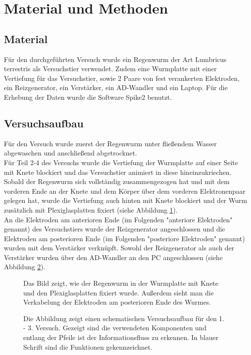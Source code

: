 \documentclass[11pt]{article}
\begin{document}
\section{Material und Methoden}
\subsection{Material}
Für den durchgeführten Versuch wurde ein Regenwurm der Art Lumbricus terrestris als Versuchstier verwendet. Zudem eine Wurmplatte mit einer Vertiefung für das Versuchstier, sowie 2 Paare von fest verankerten Elektroden, ein Reizgenerator, ein Verstärker, ein AD-Wandler und ein Laptop. Für die Erhebung der Daten wurde die Software Spike2 benutzt.
\subsection{Versuchsaufbau}
Für den Versuch wurde zuerst der Regenwurm unter fließendem Wasser abgewaschen und anschließend abgetrocknet.\\
Für Teil 2-4 des Versuchs wurde die Vertiefung der Wurmplatte auf einer Seite mit Knete blockiert und das Versuchstier animiert in diese hineinzukriechen. Sobald der Regenwurm sich vollständig zusammengezogen hat und mit dem vorderen Ende an der Knete und dem Körper über dem vorderen Elektronenpaar gelegen hat, wurde die Vertiefung auch hinten mit Knete blockiert und der Wurm zusätzlich mit Plexiglasplatten fixiert (siehe Abbildung \ref{foto}). \\
An die Elektroden am anterioren Ende (im Folgenden "{}anteriore Elektroden"{} genannt) des Versuchstiers wurde der Reizgenerator angeschlossen und die Elektroden am posterioren Ende (im Folgenden "{}posteriore Elektroden"{} genannt) wurden mit dem Verstärker verknüpft. Sowohl der Reizgenerator als auch der Verstärker wurden über den AD-Wandler an den PC angeschlossen (siehe Abbildung \ref{schema}).
\begin{figure}[H]
\caption{Das Bild zeigt, wie der Regenwurm in der Wurmplatte mit Knete und den Plexiglasplatten fixiert wurde. Außerdem sieht man die Verkabelung der Elektroden am posterioren Ende des Wurmes. }
\label{foto}
\end{figure}
\begin{figure}[H]
\caption{Die Abbildung zeigt einen schematischen Versuchsaufbau für den 1. - 3. Versuch. Gezeigt sind die verwendeten Komponenten und entlang der Pfeile ist der Informationsfluss zu erkennen. In blauer Schrift sind die Funktionen gekennzeichnet. }
\label{schema}
\end{figure}
\end{document}
